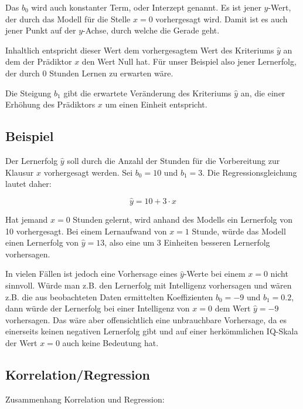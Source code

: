 \documentclass[
]{article}
\begin{document}
Das \(b_0\) wird auch konstanter Term, oder Interzept genannt. Es ist jener \(y\)-Wert, der durch das Modell für die Stelle \(x = 0\) vorhergesagt wird. Damit ist es auch jener Punkt auf der \(y\)-Achse, durch welche die Gerade geht.

Inhaltlich entspricht dieser Wert dem vorhergesagtem Wert des Kriteriums \(\hat{y}\) an dem der Prädiktor \(x\) den Wert Null hat. Für unser Beispiel also jener Lernerfolg, der durch 0 Stunden Lernen zu erwarten wäre.

Die Steigung \textbf{$b_1$} gibt die erwartete Veränderung des Kriteriums \(\hat{y}\) an, die einer Erhöhung des Prädiktors \(x\) um einen Einheit entspricht.

\subsection*{Beispiel}\label{beispiel}

Der Lernerfolg \(\hat{y}\) soll durch die Anzahl der Stunden für die Vorbereitung zur Klausur \(x\) vorhergesagt werden. Sei \(b_0 = 10\) und \(b_1 = 3\). Die Regressionsgleichung lautet daher:

\[\hat{y} = 10 + 3 \cdot x\]

Hat jemand \(x = 0\) Stunden gelernt, wird anhand des Modells ein Lernerfolg von 10 vorhergesagt. Bei einem Lernaufwand von \(x = 1\) Stunde, würde das Modell einen Lernerfolg von \(\hat{y} = 13\), also eine um 3 Einheiten besseren Lernerfolg vorhersagen.

In vielen Fällen ist jedoch eine Vorhersage eines \(\hat{y}\)-Werte bei einem \(x = 0\) nicht sinnvoll. Würde man z.B. den Lernerfolg mit Intelligenz vorhersagen und wären z.B. die aus beobachteten Daten ermittelten Koeffizienten \(b_0 = -9\) und \(b_1 = 0.2\), dann würde der Lernerfolg bei einer Intelligenz von \(x = 0\) dem Wert \(\hat{y} = -9\) vorhersagen. Das wäre aber offensichtlich eine unbrauchbare Vorhersage, da es einerseits keinen negativen Lernerfolg gibt und auf einer herkömmlichen IQ-Skala der Wert \(x = 0\) auch keine Bedeutung hat.

\subsection*{Korrelation/Regression}\label{korrelationregression}

Zusammenhang Korrelation und Regression:
\end{document}

